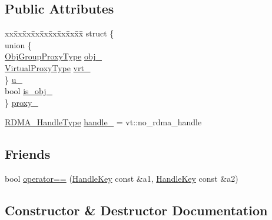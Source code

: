 \subsection*{Public Attributes}
\begin{DoxyCompactItemize}
\item 
\begin{tabbing}
xx\=xx\=xx\=xx\=xx\=xx\=xx\=xx\=xx\=\kill
struct \{\\
\>union \{\\
\>\>\hyperlink{namespacevt_ad7cae989df485fccca57f0792a880a8e}{ObjGroupProxyType} \hyperlink{structvt_1_1rdma_1_1_handle_key_a923030b26f808f1beaeb07a16c575d40}{obj\_}\\
\>\>\hyperlink{namespacevt_a1b417dd5d684f045bb58a0ede70045ac}{VirtualProxyType} \hyperlink{structvt_1_1rdma_1_1_handle_key_a8f7eb5fab7d65601e5a541797299bb83}{vrt\_}\\
\>\} \hyperlink{structvt_1_1rdma_1_1_handle_key_a589ac313252f97d907c2c03a000130f7}{u\_}\\
\>bool \hyperlink{structvt_1_1rdma_1_1_handle_key_ab0caa0cf39617bb46a86780d5a27397e}{is\_obj\_}\\
\} \hyperlink{structvt_1_1rdma_1_1_handle_key_a3a6287f21a94f486b617046232bdb109}{proxy\_}\\

\end{tabbing}\item 
\hyperlink{namespacevt_a10442579ec4e7ebef223818e64bcf908}{R\+D\+M\+A\+\_\+\+Handle\+Type} \hyperlink{structvt_1_1rdma_1_1_handle_key_aef941a463846fb7abd0080c524a3ba4c}{handle\+\_\+} = vt\+::no\+\_\+rdma\+\_\+handle
\end{DoxyCompactItemize}
\subsection*{Friends}
\begin{DoxyCompactItemize}
\item 
bool \hyperlink{structvt_1_1rdma_1_1_handle_key_a874f766caf0cd18514ce8f1d5e2c1dce}{operator==} (\hyperlink{structvt_1_1rdma_1_1_handle_key}{Handle\+Key} const \&a1, \hyperlink{structvt_1_1rdma_1_1_handle_key}{Handle\+Key} const \&a2)
\end{DoxyCompactItemize}


\subsection{Constructor \& Destructor Documentation}
\mbox{\label{structvt_1_1rdma_1_1_handle_key_ac6ce62340f11f9e63f16297366952fec}} 
